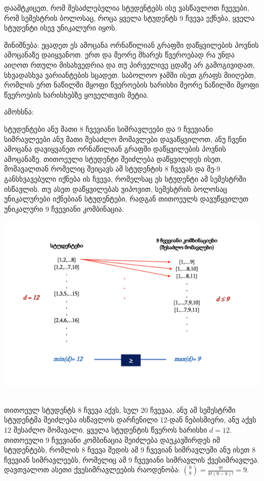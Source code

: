 \documentclass[a4paper, 11pt]{article}
\begin{document}
\begin{sloppypar}
დაამტკიცეთ, რომ შესაძლებელია სტუდენტებს ისე ვასწავლოთ ჩვევები, რომ სემესტრის ბოლოსაც, როცა ყველა სტუდენტს 9 ჩვევა ექნება, ყველა სტუდენტი ისევ უნიკალური იყოს.

მინიშნება: ეცადეთ ეს ამოცანა ორნაწილიან გრაფში დაწყვილების პოვნის ამოცანაზე დაიყვანოთ. ერთ და მეორე მხარეს წვეროებად რა უნდა აიღოთ რთული მისახვედრია და თუ პირველივე ცდაზე არ გამოგივიდათ, სხვადასხვა ვარიანტების სცადეთ. საბოლოო ჯამში ისეთ გრაფს მიიღებთ, რომლის ერთ ნაწილში მყოფი წვეროების ხარისხი მეორე ნაწილში მყოფი წვეროების ხარისხებზე ყოველთვის მეტია.

{
ამოხსნა:
}

სტუდენტები ანუ მათი 8 ჩვევიანი სიმრავლეები და 9 ჩვევიანი სიმრავლეები ანუ მათი შესაძლო მომავლები დავაწყვილოთ, ანუ ჩვენი ამოცანა დავიყვანეთ ორნაწილიან გრაფში დაწყვილების პოვნის ამოცანაზე. თითოეული სტუდენტი შეიძლება დაწყვილდეს ისეთ, მომავალთან რომელიც შეიცავს ამ სტუდენტის 8 ჩვევას და მე-9 განსხვავებული იქნება ის ჩვევა, რომელსაც ეს სტუდენტი ამ სემესტრში ისწავლის. თუ ასეთ დაწყვილებას ვიპოვით, სემესტრის ბოლოსაც უნიკალურები იქნებიან სტუდენტები, რადგან თითოეულს დავუწყვილეთ უნიკალური 9 ჩვევიანი კომბინაცია. 
\begin{center}
\includegraphics[scale = 0.7]{4.png}
\end{center}
\\ თითოეულ სტუდენტს 8 ჩვევა აქვს, სულ 20 ჩვევაა, ანუ ამ სემესტრში სტუდენტმა შეიძლება ისწავლოს დარჩენილი 12-დან ნებისმიერი, ანუ აქვს 12 შესაძლო მომავალი.
ყველა სტუდენტის წვეროს ხარისხი $d = 12$. 
\\ თითოეული 9 ჩვევიანი კომბინაცია შეიძლება დაუკავშირდეს იმ სტუდენტებს, რომლის 8 ჩვევა შედის ამ 9 ჩვევიან სიმრავლეში ანუ ისეთ 8 ჩვევიან სიმრავლეებს, რომელიც ამ 9 ჩვევიანი სიმრავლის ქვესიმრავლეა. დავთვალოთ ასეთი ქვესიმრავლეების რაოდენობა: $\binom{9}{8} = \frac{9!}{8!(9-8)!} = 9$.

\end{sloppypar}
\end{document}

